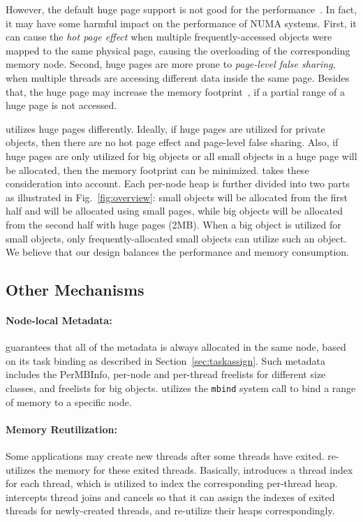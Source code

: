 However, the default huge page support is not good for the performance~\cite{Gaud:2014:LPM:2643634.2643659, 10.1145/3173162.3173203}. In fact, it may have some harmful impact on the performance of NUMA systems. First, it can cause the \textit{hot page effect} when multiple frequently-accessed objects  were  mapped  to  the  same  physical  page, causing the overloading of the corresponding memory node. Second, huge pages are more prone to \textit{page-level false sharing}, when multiple threads are accessing different data inside the same page. Besides that, the huge page may increase the memory footprint~\cite{DBLP:conf/asplos/MaasAIJMR20}, if a partial range of a huge page is not accessed. 

\NA{} utilizes huge pages differently. Ideally, if huge pages are utilized for private objects, then there are no hot page effect and page-level false sharing. Also, if huge pages are only utilized for big objects or all small objects in a huge page will be allocated, then the memory footprint can be minimized. \NA{} takes these consideration into account. Each per-node heap is further divided into two parts as illustrated in Fig.~\ref{fig:overview}: small objects will be allocated from the first half and will be allocated using small pages, while big objects will be allocated from the second half with huge pages (2MB). When a big object is utilized for small objects, only frequently-allocated small objects can utilize such an object. We believe that our design balances the performance and memory consumption.   

\subsection{Other Mechanisms}

\paragraph{Node-local Metadata:} \NM{} guarantees that all of the metadata is always allocated in the same node, based on its task binding as described in Section~\ref{sec:taskassign}. Such metadata includes the PerMBInfo, per-node and per-thread freelists for different size classes, and freelists for big objects. \NM{} utilizes the \texttt{mbind} system call to bind a range of memory to a specific node.  

\paragraph{Memory Reutilization:} Some applications may create new threads after some threads have exited. \NM{} re-utilizes the memory for these exited threads. Basically, \NM{} introduces a thread index for each thread, which is utilized to index the corresponding per-thread heap.  \NM{} intercepts thread joins and cancels so that it can assign the indexes of exited threads for newly-created threads, and re-utilize their heaps correspondingly.  






